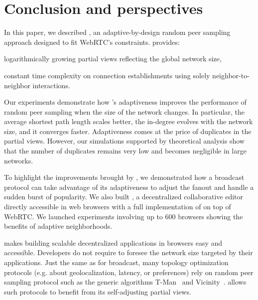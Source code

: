 
\section{Conclusion and perspectives}
\label{sec:conclusion}



In this paper, we described \SPRAY, an adaptive-by-design random peer sampling
approach designed to fit WebRTC's constraints.  \SPRAY provides:
\begin{inparaenum}[(i)]
\item logarithmically growing partial views reflecting the global network size,
\item constant time complexity on connection establishments using solely
  neighbor-to-neighbor interactions.
\end{inparaenum}
Our experiments demonstrate how \SPRAY's adaptiveness improves the performance
of random peer sampling when the size of the network changes. In particular, the
average shortest path length scales better, the in-degree evolves with the
network size, and it converges faster.  Adaptiveness comes at the price of
duplicates in the partial views. However, our simulations supported by
theoretical analysis show that the number of duplicates remains very low and
becomes negligible in large networks.

To highlight the improvements brought by \SPRAY, we demonstrated how a
broadcast protocol can take advantage of its adaptiveness to adjust
the fanout and handle a sudden burst of popularity. We also built
\CRATE, a decentralized collaborative editor directly accessible in
web browsers with a full implementation of \SPRAY on top of WebRTC. We
launched experiments involving up to 600 browsers showing the %
benefits of adaptive neighborhoods.

\SPRAY makes building scalable decentralized applications in browsers
easy and accessible.  Developers do not require to foresee the network
size targeted by their applications. Just the same as for broadcast,
many topology optimization protocols (e.g. about geolocalization,
latency, or preferences) rely on random peer sampling protocol such as
the generic algorithms T-Man~\cite{jelasity2009tman} and
Vicinity~\cite{voulgaris2005epidemic}. \SPRAY allows such protocols to
benefit from its self-adjusting partial views.


